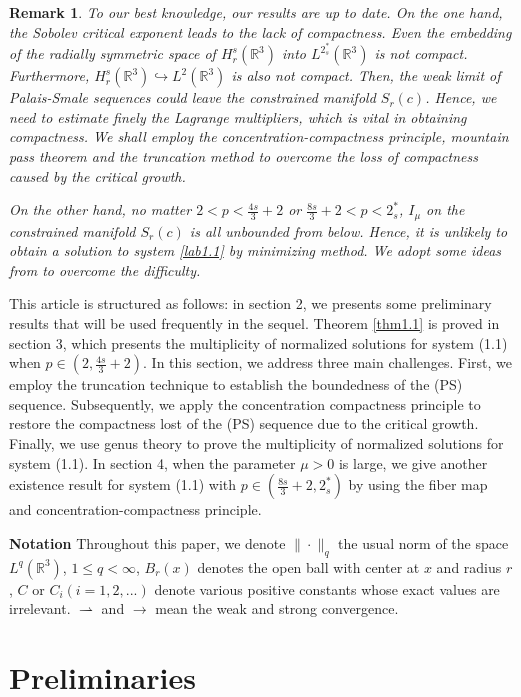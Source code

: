 \documentclass[10pt,a4paper]{amsart}
\numberwithin{equation}{section}
\newtheorem{remark}[theorem]{Remark}
\begin{document}
\setcounter{theorem}{2}
\begin{remark}\rm
To our best knowledge, our results are up to date. On the one hand,
the Sobolev critical exponent leads to the lack of compactness.
Even the embedding of the radially symmetric space of $H^s_r(\mathbb{R}^3)$ into
$L^{2^*_s}(\mathbb{R}^3)$ is not compact. Furthermore,
$H^s_r(\mathbb{R}^3)\hookrightarrow L^2(\mathbb{R}^3)$ is also not compact.
Then, the weak limit of Palais-Smale sequences could leave the constrained manifold
$S_r(c)$. Hence, we need to estimate finely the Lagrange multipliers, which is vital
in obtaining compactness. We shall employ the concentration-compactness principle,
mountain pass theorem and the truncation method to overcome the loss of compactness
caused by the critical growth.

On the other hand, no matter $2<p<{\frac{4s}{3}+2}$ or $\frac{8s}{3}+2<p<2^*_s$,
$I_\mu$ on the constrained manifold $S_r(c)$ is all unbounded from below.
Hence, it is unlikely to obtain a solution to system \eqref{lab1.1} by minimizing
method. We adopt some ideas from \cite{A5878} to overcome the difficulty.
\end{remark}

This article is structured as follows:
in section 2, we presents some preliminary results that will be  used frequently
 in the sequel.
Theorem \ref{thm1.1} is proved in section 3, which presents the multiplicity of
normalized solutions for system (1.1) when $p\in(2, \frac{4s}{3}+2)$.
In this section, we address three main challenges. First, we employ the truncation
technique to establish the boundedness of the (PS) sequence. Subsequently, we apply
the concentration compactness principle to restore the compactness lost of
the (PS) sequence due to the critical growth. Finally, we use genus theory to prove
the multiplicity of normalized solutions for system (1.1).
In section 4, when the parameter $\mu>0$ is large, we give another existence result
for system (1.1) with $p\in( \frac{8s}{3}+2, 2^*_s)$ by using the fiber map and
concentration-compactness principle.

\noindent\textbf{Notation}
Throughout this paper, we denote $\|\cdot\|_q$ the usual norm of the  space
$L^q(\mathbb{R}^3)$, $1\leq q <\infty$, $B_r(x)$ denotes the open ball with center at
$x$ and radius $r$, $C$ or $C_i (i=1,2,...)$ denote various positive constants whose
exact values are irrelevant. $\rightharpoonup$ and $\to$ mean the weak and strong
convergence.


\section{Preliminaries}
\end{document}
